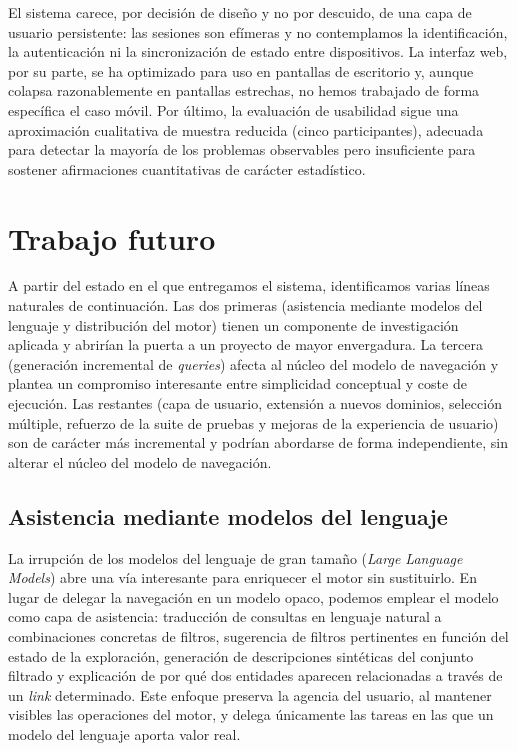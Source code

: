 El sistema carece, por decisión de diseño y no por descuido, de una capa de usuario persistente:
las sesiones son efímeras y no contemplamos la identificación, la autenticación ni la
sincronización de estado entre dispositivos. La interfaz web, por su parte, se ha optimizado
para uso en pantallas de escritorio y, aunque colapsa razonablemente en pantallas estrechas,
no hemos trabajado de forma específica el caso móvil. Por último, la evaluación de usabilidad
sigue una aproximación cualitativa de muestra reducida (cinco participantes),
adecuada para detectar la mayoría de los problemas observables pero insuficiente para sostener
afirmaciones cuantitativas de carácter estadístico.

\section{Trabajo futuro}
\label{sec:trabajoFuturo}

A partir del estado en el que entregamos el sistema, identificamos varias líneas naturales de
continuación. Las dos primeras (asistencia mediante modelos del lenguaje y distribución del
motor) tienen un componente de investigación aplicada y abrirían la puerta a un proyecto de
mayor envergadura. La tercera (generación incremental de \textit{queries}) afecta al núcleo del
modelo de navegación y plantea un compromiso interesante entre simplicidad conceptual y coste de
ejecución. Las restantes (capa de usuario, extensión a nuevos dominios, selección múltiple,
refuerzo de la suite de pruebas y mejoras de la experiencia de usuario) son de carácter más
incremental y podrían abordarse de forma independiente, sin alterar el núcleo del modelo de
navegación.

\subsection{Asistencia mediante modelos del lenguaje}

La irrupción de los modelos del lenguaje de gran tamaño (\textit{Large Language Models}) abre
una vía interesante para enriquecer el motor sin sustituirlo. En lugar de delegar la navegación
en un modelo opaco, podemos emplear el modelo como capa de asistencia: traducción de consultas
en lenguaje natural a combinaciones concretas de filtros, sugerencia de filtros pertinentes en
función del estado de la exploración, generación de descripciones sintéticas del conjunto
filtrado y explicación de por qué dos entidades aparecen relacionadas a través de un \textit{link}
determinado. Este enfoque preserva la agencia del usuario, al mantener visibles las operaciones
del motor, y delega únicamente las tareas en las que un modelo del lenguaje aporta valor real.

